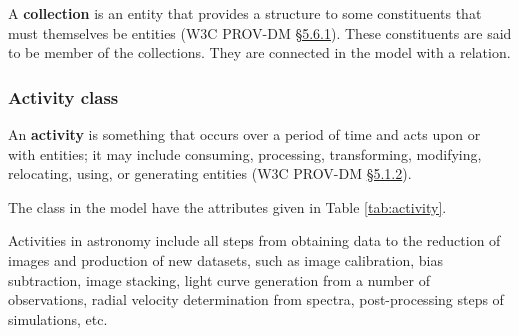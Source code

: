 A \textbf{collection} is an entity that provides a structure to some constituents that must themselves be entities (W3C PROV-DM \href{https://www.w3.org/TR/prov-dm/#term-collection}{\S5.6.1}). These constituents are said to be member of the collections. They are connected in the model with a  relation.


\subsubsection{Activity class}
\label{sec:activity}

An \textbf{activity} is something that occurs over a period of time and acts upon or with entities; it may include consuming, processing, transforming, modifying, relocating, using, or generating entities (W3C PROV-DM \href{https://www.w3.org/TR/prov-dm/#term-Activity}{\S5.1.2}). 

The  class in the model have the attributes given in Table \ref{tab:activity}. 

Activities in astronomy include all steps from obtaining data to the reduction
of  images and production of new datasets, such as image calibration, bias
subtraction, image stacking, light curve generation from a number of
observations, radial velocity determination from spectra, post-processing steps
of simulations, etc.


